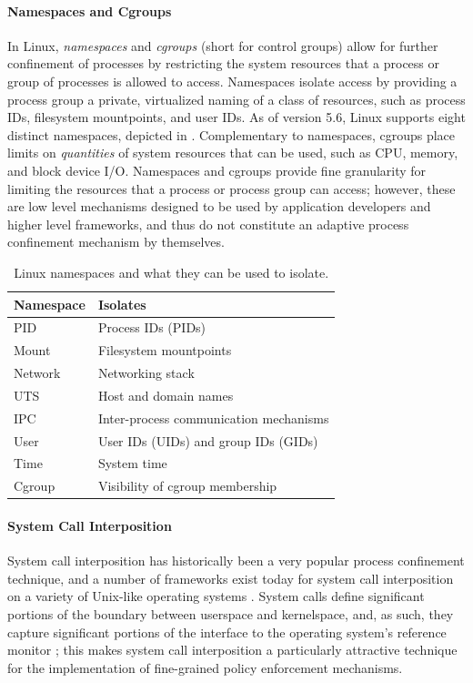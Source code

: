 \documentclass[dvipsnames, 12pt]{article}
\begin{document}
\paragraph*{Namespaces and Cgroups}
In Linux, \textit{namespaces} and \textit{cgroups} (short for control groups)
allow for further confinement of processes by restricting the system resources
that a process or group of processes is allowed to access. Namespaces isolate
access by providing a process group a private, virtualized naming of a class of
resources, such as process IDs, filesystem mountpoints, and user IDs. As of
version 5.6, Linux supports eight distinct namespaces, depicted in
.  Complementary to namespaces, cgroups place limits on
\textit{quantities} of system resources that can be used, such as CPU, memory,
and block device I/O.  Namespaces and cgroups provide fine granularity for
limiting the resources that a process or process group can access; however,
these are low level mechanisms designed to be used by application developers and
higher level frameworks, and thus do not constitute an adaptive process
confinement mechanism by themselves.

\begin{table}
\begin{tabular}{lp{3in}}
    \toprule
    Namespace & Isolates \\
    \midrule
    \multirow{1}{*}{PID} & Process IDs (PIDs)\\
    \multirow{1}{*}{Mount} & Filesystem mountpoints\\
    \multirow{1}{*}{Network} & Networking stack\\
    \multirow{1}{*}{UTS} & Host and domain names\\
    \multirow{1}{*}{IPC} & Inter-process communication mechanisms\\
    \multirow{1}{*}{User} & User IDs (UIDs) and group IDs (GIDs)\\
    \multirow{1}{*}{Time} & System time\\
    \multirow{1}{*}{Cgroup} & Visibility of cgroup membership\\
    \bottomrule
\end{tabular}
\caption{Linux namespaces and what they can be used to isolate.}
\label{tab:namespaces}
\end{table}

\paragraph*{System Call Interposition} System call interposition has
historically been a very popular process confinement technique, and a number of
frameworks exist today for system call interposition on a variety of Unix-like
operating systems \cite{anderson2017_comparison, padala2002_ptrace,
watson2010_capsicum, pledge}.  System calls define significant portions of the
boundary between userspace and kernelspace, and, as such, they capture
significant portions of the interface to the operating system's reference
monitor \cite{anderson1973_reference_monitor}; this makes system call
interposition a particularly attractive technique for the implementation of
fine-grained policy enforcement mechanisms.
\end{document}
